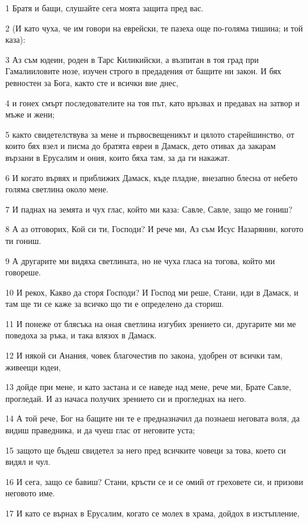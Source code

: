 \par 1 Братя и бащи, слушайте сега моята защита пред вас.
\par 2 (И като чуха, че им говори на еврейски, те пазеха още по-голяма тишина; и той каза):
\par 3 Аз съм юдеин, роден в Тарс Киликийски, а възпитан в тоя град при Гамалииловите нозе, изучен строго в предадения от бащите ни закон. И бях ревностен за Бога, както сте и всички вие днес,
\par 4 и гонех смърт последователите на тоя път, като връзвах и предавах на затвор и мъже и жени;
\par 5 както свидетелствува за мене и първосвещеникът и цялото старейшинство, от които бях взел и писма до братята евреи в Дамаск, дето отивах да закарам вързани в Ерусалим и ония, които бяха там, за да ги накажат.
\par 6 И когато вървях и приближих Дамаск, къде пладне, внезапно блесна от небето голяма светлина около мене.
\par 7 И паднах на земята и чух глас, който ми каза: Савле, Савле, защо ме гониш?
\par 8 А аз отговорих, Кой си ти, Господи? И рече ми, Аз съм Исус Назарянин, когото ти гониш.
\par 9 А другарите ми видяха светлината, но не чуха гласа на тогова, който ми говореше.
\par 10 И рекох, Какво да сторя Господи? И Господ ми реше, Стани, иди в Дамаск, и там ще ти се каже за всичко що ти е определено да сториш.
\par 11 И понеже от блясъка на оная светлина изгубих зрението си, другарите ми ме поведоха за ръка, и така влязох в Дамаск.
\par 12 И някой си Анания, човек благочестив по закона, удобрен от всички там, живеещи юдеи,
\par 13 дойде при мене, и като застана и се наведе над мене, рече ми, Брате Савле, прогледай. И аз начаса получих зрението си и прогледнах на него.
\par 14 А той рече, Бог на бащите ни те е предназначил да познаеш неговата воля, да видиш праведника, и да чуеш глас от неговите уста;
\par 15 защото ще бъдеш свидетел за него пред всичките човеци за това, което си видял и чул.
\par 16 И сега, защо се бавиш? Стани, кръсти се и се омий от греховете си, и призови неговото име.
\par 17 И като се върнах в Ерусалим, когато се молех в храма, дойдох в изстъпление,
